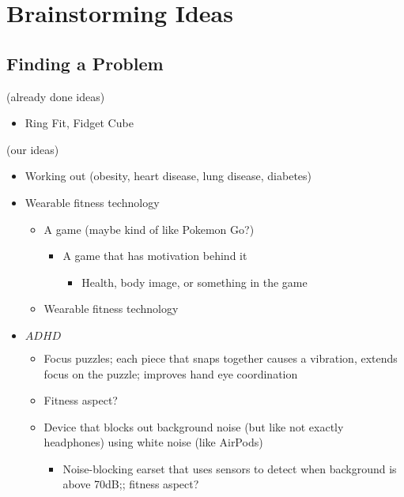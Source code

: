 \documentclass{article}
\newcommand{\highlight}[1]{%
  \colorbox{yellowOrange}{$\displaystyle#1$}}
\begin{document}
\begin{center}
\end{center}

\section{Brainstorming Ideas}

\subsection{Finding a Problem}
(already done ideas)
\begin{itemize}
  \item Ring Fit, Fidget Cube
\end{itemize}
(our ideas)
\begin{itemize}
  \item Working out (obesity, heart disease, lung disease, diabetes)
  \item Wearable fitness technology
  \begin{itemize}
    \item A game (maybe kind of like Pokemon Go?)
    \begin{itemize}
      \item A game that has motivation behind it
      \begin{itemize}
        \item Health, body image, or something in the game
      \end{itemize}
    \end{itemize}
    \item Wearable fitness technology
  \end{itemize}
  \item \highlight{ADHD}
  \begin{itemize}
    \item Focus puzzles; each piece that snaps together causes a vibration, extends focus on the puzzle; improves hand eye coordination
    \item Fitness aspect?
    \item Device that blocks out background noise (but like not exactly headphones) using white noise (like AirPods)
    \begin{itemize}
      \item Noise-blocking earset that uses sensors to detect when background is above 70dB;; fitness aspect?
    \end{itemize}
  \end{itemize}

\end{itemize}
\end{document}
